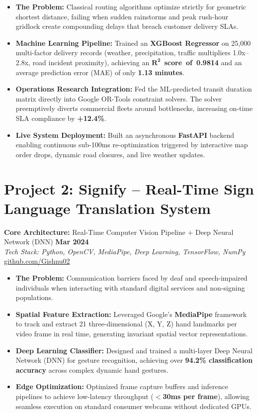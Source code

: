 \documentclass[letterpaper,10pt]{article}
\newcommand{\resumeItem}[1]{
  \item\small{
    {#1 \vspace{-2pt}}
  }
}
\begin{document}
\begin{itemize}
    \resumeItem{\textbf{The Problem:} Classical routing algorithms optimize strictly for geometric shortest distance, failing when sudden rainstorms and peak rush-hour gridlock create compounding delays that breach customer delivery SLAs.}
    \resumeItem{\textbf{Machine Learning Pipeline:} Trained an \textbf{XGBoost Regressor} on 25,000 multi-factor delivery records (weather, precipitation, traffic multipliers 1.0x--2.8x, road incident proximity), achieving an \mbox{$\mathbf{R^2}$ \textbf{score of 0.9814}} and an average prediction error (MAE) of only \textbf{1.13 minutes}.}
    \resumeItem{\textbf{Operations Research Integration:} Fed the ML-predicted transit duration matrix directly into Google OR-Tools constraint solvers. The solver preemptively diverts commercial fleets around bottlenecks, increasing on-time SLA compliance by \textbf{+12.4\%}.}
    \resumeItem{\textbf{Live System Deployment:} Built an asynchronous \textbf{FastAPI} backend enabling continuous sub-100ms re-optimization triggered by interactive map order drops, dynamic road closures, and live weather updates.}
\end{itemize}
\vspace{-2pt}

\section{Project 2: Signify -- Real-Time Sign Language Translation System}
\textbf{Core Architecture:} Real-Time Computer Vision Pipeline + Deep Neural Network (DNN) \hfill \textbf{Mar 2024} \\
\textit{\small Tech Stack: Python, OpenCV, MediaPipe, Deep Learning, TensorFlow, NumPy} \hfill \href{https://github.com/Gishnu02}{\color{NavyBlue}\small github.com/Gishnu02}

\begin{itemize}
    \resumeItem{\textbf{The Problem:} Communication barriers faced by deaf and speech-impaired individuals when interacting with standard digital services and non-signing populations.}
    \resumeItem{\textbf{Spatial Feature Extraction:} Leveraged Google's \textbf{MediaPipe} framework to track and extract 21 three-dimensional (X, Y, Z) hand landmarks per video frame in real time, generating invariant spatial vector representations.}
    \resumeItem{\textbf{Deep Learning Classifier:} Designed and trained a multi-layer Deep Neural Network (DNN) for gesture recognition, achieving over \textbf{94.2\% classification accuracy} across complex dynamic hand gestures.}
    \resumeItem{\textbf{Edge Optimization:} Optimized frame capture buffers and inference pipelines to achieve low-latency throughput (\textbf{$<$30ms per frame}), allowing seamless execution on standard consumer webcams without dedicated GPUs.}
\end{itemize}
\vspace{-2pt}
\end{document}
